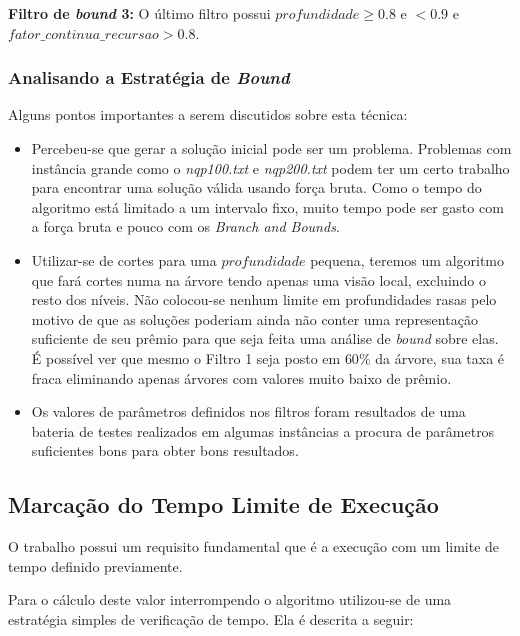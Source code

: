\documentclass[12pt]{article}
\begin{document}
			\textbf{Filtro de \textit{bound} 3:} O último filtro possui $ profundidade \ge 0.8 $ e $ < 0.9 $ e $ fator\_continua\_recursao > 0.8$.


		\subsubsection{Analisando a Estratégia de \textit{Bound}}

			Alguns pontos importantes a serem discutidos sobre esta técnica:

			\begin{itemize}
				\item Percebeu-se que gerar a solução inicial pode ser um problema. Problemas com instância grande como o \textit{nqp100.txt} e \textit{nqp200.txt} podem ter um certo trabalho para encontrar uma solução válida usando força bruta. Como o tempo do algoritmo está limitado a um intervalo fixo, muito tempo pode ser gasto com a força bruta e pouco com os \textit{Branch and Bounds}.

				\item Utilizar-se de cortes para uma $ profundidade $ pequena, teremos um algoritmo que fará cortes numa na árvore tendo apenas uma visão local, excluindo o resto dos níveis. Não colocou-se nenhum limite em profundidades rasas pelo motivo de que as soluções poderiam ainda não conter uma representação suficiente de seu prêmio para que seja feita uma análise de \textit{bound} sobre elas. É possível ver que mesmo o Filtro 1 seja posto em $ 60\% $ da árvore, sua taxa é fraca eliminando apenas árvores com valores muito baixo de prêmio.

				\item Os valores de parâmetros definidos nos filtros foram resultados de uma bateria de testes realizados em algumas instâncias a procura de parâmetros suficientes bons para obter bons resultados.
			\end{itemize}


	\subsection{Marcação do Tempo Limite de Execução}
		O trabalho possui um requisito fundamental que é a execução com um limite de tempo definido previamente.

		Para o cálculo deste valor interrompendo o algoritmo utilizou-se de uma estratégia simples de verificação de tempo. Ela é descrita a seguir:
\end{document}
